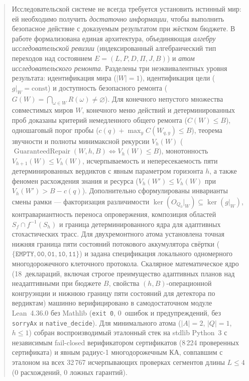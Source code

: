 \documentclass[11pt,a4paper]{article}
\theoremstyle{preprintthm}
\theoremstyle{preprintdef}
\newcommand{\kerrel}{\operatorname{ker}}
\begin{document}
\begin{abstract}
\noindent
Исследовательской системе не всегда требуется установить истинный мир: ей необходимо получить \emph{достаточно информации}, чтобы выполнить безопасное действие с доказуемым результатом при жёстком бюджете. В работе формализована единая архитектура, объединяющая \emph{алгебру исследовательской ревизии} (индексированный алгебраический тип переходов над состоянием $E=(L,P,D,\Pi,J,B)$) и \emph{атом исследовательского ремонта}. Разделены три неэквивалентных уровня результата: идентификация мира ($|W|=1$), идентификация цели ($g|_W=\mathrm{const}$) и доступность безопасного ремонта ($G(W)=\bigcap_{\omega\in W}R(\omega)\ne\varnothing$). Для конечного непустого множества совместимых миров $W$, конечного меню действий и детерминированных проб доказаны критерий немедленного общего ремонта ($C(W)\le B$), одношаговый порог пробы ($c(q)+\max_y C(W_{q,y})\le B$), теорема звучности и полноты минимаксной рекурсии $V_h(W)$ ($\operatorname{GuaranteedRepair}(W,h,B)\iff V_h(W)\le B$), монотонность $V_{h+1}(W)\le V_h(W)$, исчерпываемость и непересекаемость пяти детерминированных вердиктов с явным параметром горизонта $h$, а также феномен расхождения знания и ресурса ($V_h(W')\le V_h(W)$ при $V_h(W')>B-c(q)$). Дополнительно сформулированы инварианты смены рамки --- факторизация различимости $\kerrel(O_{Q_0}|_W)\subseteq\kerrel(g|_W)$, контравариантность переноса опровержения, композиция областей $S_f\cap f^{-1}(S_h)$ и граница детерминированного ядра для адаптивных стохастических трасс. Для двухремонтного атома установлена точная нижняя граница пяти состояний потокового аккумулятора свёртки ($\{\texttt{EMPTY},\texttt{00},\texttt{01},\texttt{10},\texttt{11}\}$) и задана спецификация локального одномерного многодорожечного клеточного протокола. Скалярное математическое ядро (18~деклараций, включая строгое преимущество адаптивных планов над неадаптивными при бюджете $B$, свойства $(h,B)$-операционной конгруэнции и нижнюю границу пяти состояний для детектора по вердиктам) машинно верифицировано в самодостаточном модуле Lean~4.36.0 без Mathlib (\texttt{exit 0}, 0~ошибок и предупреждений, без \texttt{sorryAx} и \texttt{native\_decide}). Для минимального атома ($|A|=2$, $|Q|=1$, $h\le 1$) собран воспроизводимый эталонный стек на stdlib Python~3 с независимым fail-closed верификатором сертификатов (8\,224 проверенных сертификата) и явным радиус-1 многодорожечным КА, совпавшим с эталоном на всех 32\,767 исчерпывающих проверках сегментов длины $L\le 4$ (0 расхождений, 0 ложных гарантий).
\end{abstract}
\end{document}
